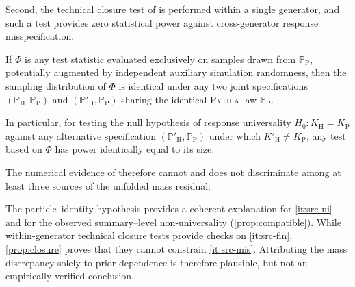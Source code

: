 \documentclass[12pt]{article}
\newcommand{\Herwig}{\mathrm{H}}
\newcommand{\Pythia}{\mathrm{P}}
\newcommand{\Prb}{\mathbb{P}}
\newcommand{\1}{\mathbbm{1}}
\renewcommand{\[}{\begin{equation}}
\renewcommand{\]}{\end{equation}}
\begin{document}
    Second, the technical closure test of \textcite{Andreassen:2019cjw} is performed within a single generator, and such a test provides zero statistical power against cross-generator response misspecification.

\begin{proposition}
    \label{prop:closure}
        If \(\Phi\) is any test statistic evaluated exclusively on samples drawn from \(\Prb_\Pythia\), potentially augmented by independent auxiliary simulation randomness,
        then the sampling distribution of \(\Phi\) is identical under any two joint specifications \((\Prb_\Herwig,\Prb_\Pythia)\) and \((\Prb'_\Herwig,\Prb_\Pythia)\) sharing the identical \textsc{Pythia} law \(\Prb_\Pythia\).
        
        In particular, for testing the null hypothesis of response universality \(H_0 \colon K_\Herwig = K_\Pythia\) against any alternative specification \((\Prb'_\Herwig,\Prb_\Pythia)\) under which \(K'_\Herwig \ne K_\Pythia\), any test based on \(\Phi\) has power identically equal to its size.
    \end{proposition}

    The numerical evidence of \textcite{Andreassen:2019cjw} therefore cannot and does not discriminate among at least three sources of the unfolded mass residual:
    The particle--identity hypothesis provides a coherent explanation for \cref{it:src-ni} and for the observed summary--level non-universality (\cref{prop:compatible}).
    While within-generator technical closure tests provide checks on \cref{it:src-fin}, \cref{prop:closure} proves that they cannot constrain \cref{it:src-mis}.
    Attributing the mass discrepancy solely to prior dependence is therefore plausible, but not an empirically verified conclusion.
\end{document}
